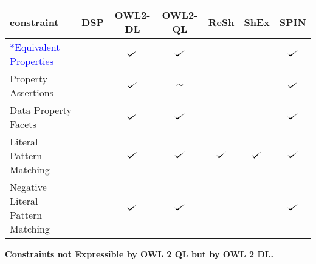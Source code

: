 \documentclass{llncs}
\def\checkmark{\tikz\fill[scale=0.4](0,.35) -- (.25,0) -- (1,.7) -- (.25,.15) -- cycle;}
\newenvironment{evaluation}{
  \scriptsize
  \sffamily
  \vspace{0.3cm}
  \begin{tabular}{l|c|c|c|c|c|c}
  \hline
  \textbf{constraint} & \textbf{DSP} & \textbf{OWL2-DL} & \textbf{OWL2-QL} & \textbf{ReSh} & \textbf{ShEx} & \textbf{SPIN} \\
  \hline

}{
  \hline
  \end{tabular}
  \linebreak
}
\begin{document}
\begin{evaluation}
\textcolor{blue}{*Equivalent Properties} & \ding{55} & $\checkmark$ & $\checkmark$ & \ding{55} & \ding{55} & $\checkmark$ \\
Property Assertions & \ding{55} & $\checkmark$ & $\sim$ & \ding{55} & \ding{55} & $\checkmark$ \\
Data Property Facets & \ding{55} & $\checkmark$ & $\checkmark$ & \ding{55} & \ding{55} & $\checkmark$ \\
Literal Pattern Matching & \ding{55} & $\checkmark$ & $\checkmark$ & $\checkmark$ & $\checkmark$ & $\checkmark$ \\
Negative Literal Pattern Matching & \ding{55} & $\checkmark$ & $\checkmark$ & & & $\checkmark$ \\
\end{evaluation}

\textbf{Constraints not Expressible by OWL 2 QL but by OWL 2 DL.}
\end{document}
